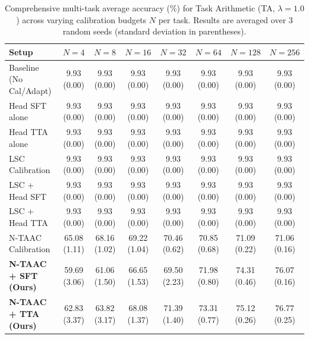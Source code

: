 \begin{table}[ht]
\centering
\caption{Comprehensive multi-task average accuracy (\%) for Task Arithmetic (TA, $\lambda=1.0$) across varying calibration budgets $N$ per task. Results are averaged over 3 random seeds (standard deviation in parentheses).}
\label{tab:appendix_ta_10}
\vskip 0.15in
\begin{sc}
\begin{scriptsize}
\setlength{\tabcolsep}{3pt}
\begin{tabular}{lccccccc}
\toprule
Setup & $N=4$ & $N=8$ & $N=16$ & $N=32$ & $N=64$ & $N=128$ & $N=256$ \\
\midrule
Baseline (No Cal/Adapt) & 9.93 (0.00) & 9.93 (0.00) & 9.93 (0.00) & 9.93 (0.00) & 9.93 (0.00) & 9.93 (0.00) & 9.93 (0.00) \\
Head SFT alone & 9.93 (0.00) & 9.93 (0.00) & 9.93 (0.00) & 9.93 (0.00) & 9.93 (0.00) & 9.93 (0.00) & 9.93 (0.00) \\
Head TTA alone & 9.93 (0.00) & 9.93 (0.00) & 9.93 (0.00) & 9.93 (0.00) & 9.93 (0.00) & 9.93 (0.00) & 9.93 (0.00) \\
LSC Calibration & 9.93 (0.00) & 9.93 (0.00) & 9.93 (0.00) & 9.93 (0.00) & 9.93 (0.00) & 9.93 (0.00) & 9.93 (0.00) \\
LSC + Head SFT & 9.93 (0.00) & 9.93 (0.00) & 9.93 (0.00) & 9.93 (0.00) & 9.93 (0.00) & 9.93 (0.00) & 9.93 (0.00) \\
LSC + Head TTA & 9.93 (0.00) & 9.93 (0.00) & 9.93 (0.00) & 9.93 (0.00) & 9.93 (0.00) & 9.93 (0.00) & 9.93 (0.00) \\
N-TAAC Calibration & 65.08 (1.11) & 68.16 (1.02) & 69.22 (1.04) & 70.46 (0.62) & 70.85 (0.68) & 71.09 (0.22) & 71.06 (0.16) \\
\textbf{N-TAAC + SFT (Ours)} & 59.69 (3.06) & 61.06 (1.50) & 66.65 (1.53) & 69.50 (2.23) & 71.98 (0.80) & 74.31 (0.46) & 76.07 (0.16) \\
\textbf{N-TAAC + TTA (Ours)} & 62.83 (3.37) & 63.82 (3.17) & 68.08 (1.37) & 71.39 (1.40) & 73.31 (0.77) & 75.12 (0.26) & 76.77 (0.25) \\
\bottomrule
\end{tabular}
\end{scriptsize}
\end{sc}
\end{table}

